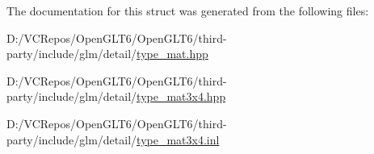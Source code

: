 The documentation for this struct was generated from the following files\+:\begin{DoxyCompactItemize}
\item 
D\+:/\+V\+C\+Repos/\+Open\+G\+L\+T6/\+Open\+G\+L\+T6/third-\/party/include/glm/detail/\mbox{\hyperlink{type__mat_8hpp}{type\+\_\+mat.\+hpp}}\item 
D\+:/\+V\+C\+Repos/\+Open\+G\+L\+T6/\+Open\+G\+L\+T6/third-\/party/include/glm/detail/\mbox{\hyperlink{type__mat3x4_8hpp}{type\+\_\+mat3x4.\+hpp}}\item 
D\+:/\+V\+C\+Repos/\+Open\+G\+L\+T6/\+Open\+G\+L\+T6/third-\/party/include/glm/detail/\mbox{\hyperlink{type__mat3x4_8inl}{type\+\_\+mat3x4.\+inl}}\end{DoxyCompactItemize}
